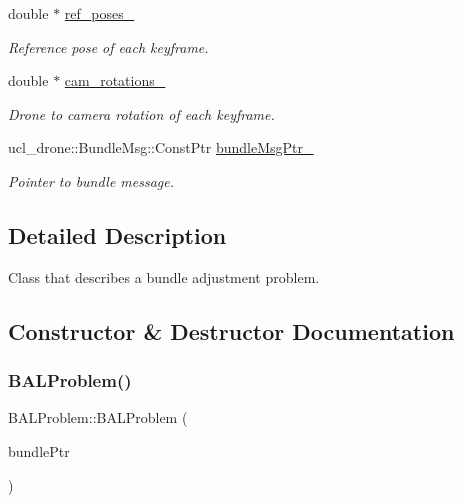 \begin{DoxyCompactItemize}
double $\ast$ \hyperlink{classBALProblem_a913fc7e394e953605eb8fd4eabdba27f}{ref\+\_\+poses\+\_\+}
\begin{DoxyCompactList}\small\item\em Reference pose of each keyframe. \end{DoxyCompactList}\item 
\mbox{\label{classBALProblem_a17d631353328b43894488ea06ee8d95d}} 
double $\ast$ \hyperlink{classBALProblem_a17d631353328b43894488ea06ee8d95d}{cam\+\_\+rotations\+\_\+}
\begin{DoxyCompactList}\small\item\em Drone to camera rotation of each keyframe. \end{DoxyCompactList}\item 
\mbox{\label{classBALProblem_a0a6bdd9b5c6f327f1d44e725abbf7c08}} 
ucl\+\_\+drone\+::\+Bundle\+Msg\+::\+Const\+Ptr \hyperlink{classBALProblem_a0a6bdd9b5c6f327f1d44e725abbf7c08}{bundle\+Msg\+Ptr\+\_\+}
\begin{DoxyCompactList}\small\item\em Pointer to bundle message. \end{DoxyCompactList}\end{DoxyCompactItemize}


\subsection{Detailed Description}
Class that describes a bundle adjustment problem. 

\subsection{Constructor \& Destructor Documentation}
\mbox{\label{classBALProblem_adb33eb5929766ce616575e54a93a214f}} 
\subsubsection{\texorpdfstring{B\+A\+L\+Problem()}{BALProblem()}}
{\footnotesize\ttfamily B\+A\+L\+Problem\+::\+B\+A\+L\+Problem (\begin{DoxyParamCaption}\item[{const ucl\+\_\+drone\+::\+Bundle\+Msg\+::\+Const\+Ptr}]{bundle\+Ptr }\end{DoxyParamCaption})}



